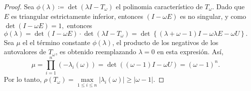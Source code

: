 \begin{frame}
	\begin{proof}
		Sea
		\begin{math}
			\phi\left(\lambda\right)\coloneqq
			\det\left(\lambda I-T_{\omega}\right)
		\end{math}
		el polinomia característico de $T_{\omega}$.
		Dado que $E$ es triangular estrictamente inferior, entonces
		$\left(I-\omega E\right)$ es no singular, y como
		\begin{math}
			\det\left(I-\omega E\right)=1,
		\end{math}
		entonces
		\begin{equation*}
			\phi\left(\lambda\right)=
			\det\left(I-\omega E\right)\cdot
			\det\left(\lambda I-T_{\omega}\right)=
			\det\left\{
			\left(\lambda+\omega-1\right)I-
			\omega\lambda E-\omega U
			\right\}.
		\end{equation*}
		Sea $\mu$ el el término constante $\phi\left(\lambda\right)$, el
		producto de los negativos de los autovalores de $T_{\omega}$,
		es obtenido reemplazando $\lambda=0$ en esta expresión.
		Así,
		\begin{equation*}
			\mu=
			\prod_{i=1}^{n}
			\left(-\lambda_{i}\left(\omega\right)\right)=
			\det
			\left(
			\left(\omega-1\right)I-\omega U
			\right)
			=
			{\left(\omega-1\right)}^{n}.
		\end{equation*}
		Por lo tanto,
		\begin{math}
			\rho\left(T_{\omega}\right)=
			\max\limits_{1\leq i\leq n}
			\left|\lambda_{i}\left(\omega\right)\right|\geq
			|\omega-1|
		\end{math}.
	\end{proof}
\end{frame}

